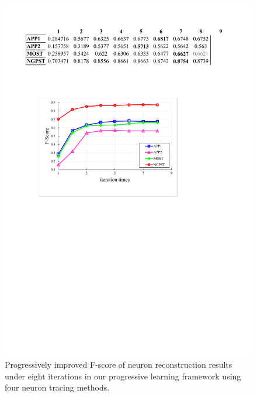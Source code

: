 \begin{figure}[t]
	\centering
	\includegraphics[width=0.8\columnwidth]{./Illustrations/trace_iterations_fscore8.pdf}
	\caption{Progressively improved F-score of neuron reconstruction results under eight iterations in our progressive learning framework using four neuron tracing methods.}%
	\label{fig:fscore_iterations}
\end{figure}

